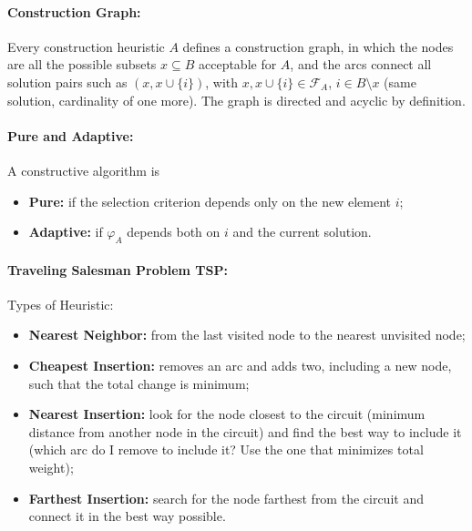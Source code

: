 \documentclass{article}
\begin{document}
	\paragraph{Construction Graph:} Every construction heuristic $A$ defines a construction graph, in which the nodes are all the possible subsets $x \subseteq B$ acceptable for $A$, and the arcs connect all solution pairs such as $(x, x \cup \{i\})$, with $x, x \cup \{i\} \in \mathcal{F}_A$, $i \in B \setminus x$ (same solution, cardinality of one more). The graph is directed and acyclic by definition.\\
	
	\paragraph{Pure and Adaptive:} A constructive algorithm is 
	\begin{itemize}
		\item \textbf{Pure:} if the selection criterion depends only on the new element $i$;
		\item \textbf{Adaptive:} if $\varphi_A$ depends both on $i$ and the current solution.\\
	\end{itemize}
	
	\paragraph{Traveling Salesman Problem TSP:} Types of Heuristic: 
	\begin{itemize}
		\item \textbf{Nearest Neighbor:} from the last visited node to the nearest unvisited node;
		\item \textbf{Cheapest Insertion:} removes an arc and adds two, including a new node, such that the total change is minimum;
		\item \textbf{Nearest Insertion:} look for the node closest to the circuit (minimum distance from another node in the circuit) and find the best way to include it (which arc do I remove to include it? Use the one that minimizes total weight);
		\item \textbf{Farthest Insertion:} search for the node farthest from the circuit and connect it in the best way possible.\\
	\end{itemize}
	
\end{document}
